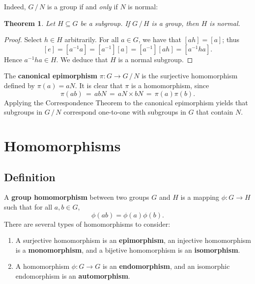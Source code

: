 \documentclass[11pt]{article}
\newtheorem{theorem}{Theorem}
\begin{document}
Indeed, $G \, / \, N$ is a group if and \textit{only} if $N$ is normal:

\begin{adjustwidth}{0.5cm}{}
  \begin{theorem}
    Let $H \subseteq G$ be a subgroup. If $G \, / \, H$ is a group, then $H$ is normal.
  \end{theorem}
  \begin{proof}
    Select $h \in H$ arbitrarily. For all $a \in G$, we have that $[ah] = [a]$; thus
    \[
      [e] = [a^{-1} a] = [a^{-1}] [a] = [a^{-1}] [ah] = [a^{-1}ha].
    \]
    Hence $a^{-1}ha \in H$. We deduce that $H$ is a normal subgroup.
  \end{proof}
\end{adjustwidth}

The \textbf{canonical epimorphism} $\pi : G \to G \, / \, N$ is the surjective homomorphism defined by $\pi(a) = aN$. It is clear that $\pi$ is a homomorphism, since
\[
  \pi(ab) \, = \, abN \, = \, aN \times bN \, = \, \pi(a) \pi(b).
\]
Applying the Correspondence Theorem to the canonical epimorphism yields that subgroups in $G \, / \, N$ correspond one-to-one with subgroups in $G$ that contain $N$.


\section{Homomorphisms}


\subsection{Definition}

A \textbf{group homomorphism} between two groups $G$ and $H$ is a mapping $\phi : G \to H$  such that for all $a, b \in G$,
\[
  \phi(ab) = \phi(a) \phi(b).
\]
There are several types of homomorphisms to consider:
\begin{enumerate}
  \item A surjective homomorphism is an \textbf{epimorphism}, an injective homomorphism is a \textbf{monomorphism}, and a bijetive homomorphism is an \textbf{isomorphism}.
  \item A homomorphism $\phi : G \to G$ is an \textbf{endomorphism}, and an isomorphic endomorphism is an \textbf{automorphism}.
\end{enumerate}
\end{document}
